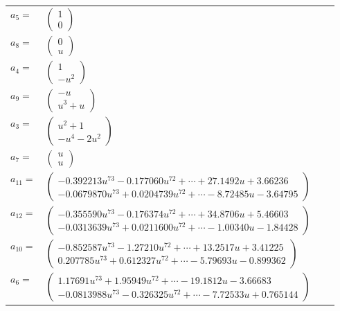 \documentclass[1p]{elsarticle_modified}
\theoremstyle{definition}
\begin{document}
\begin{tabular}{m{7pt} m{180pt} m{7pt} m{180pt} }
\flushright $a_{5}=$&$\begin{pmatrix}1\\0\end{pmatrix}$ \\
\flushright $a_{8}=$&$\begin{pmatrix}0\\u\end{pmatrix}$ \\
\flushright $a_{4}=$&$\begin{pmatrix}1\\- u^2\end{pmatrix}$ \\
\flushright $a_{9}=$&$\begin{pmatrix}- u\\u^3+u\end{pmatrix}$ \\
\flushright $a_{3}=$&$\begin{pmatrix}u^2+1\\- u^4-2 u^2\end{pmatrix}$ \\
\flushright $a_{7}=$&$\begin{pmatrix}u\\u\end{pmatrix}$ \\
\flushright $a_{11}=$&$\begin{pmatrix}-0.392213 u^{73}-0.177060 u^{72}+\cdots+27.1492 u+3.66236\\-0.0679870 u^{73}+0.0204739 u^{72}+\cdots-8.72485 u-3.64795\end{pmatrix}$ \\
\flushright $a_{12}=$&$\begin{pmatrix}-0.355590 u^{73}-0.176374 u^{72}+\cdots+34.8706 u+5.46603\\-0.0313639 u^{73}+0.0211600 u^{72}+\cdots-1.00340 u-1.84428\end{pmatrix}$ \\
\flushright $a_{10}=$&$\begin{pmatrix}-0.852587 u^{73}-1.27210 u^{72}+\cdots+13.2517 u+3.41225\\0.207785 u^{73}+0.612327 u^{72}+\cdots-5.79693 u-0.899362\end{pmatrix}$ \\
\flushright $a_{6}=$&$\begin{pmatrix}1.17691 u^{73}+1.95949 u^{72}+\cdots-19.1812 u-3.66683\\-0.0813988 u^{73}-0.326325 u^{72}+\cdots-7.72533 u+0.765144\end{pmatrix}$ \\

\end{tabular}
\end{document}
